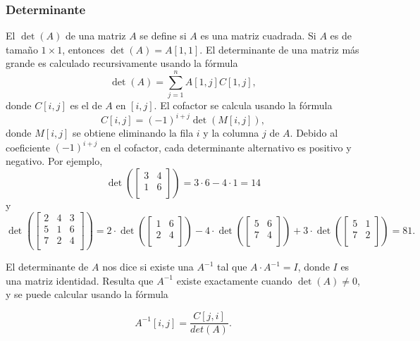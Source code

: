 \subsubsection{Determinante}


El  $\det(A)$ de una matriz $A$
se define si $A$ es una matriz cuadrada.
Si $A$ es de tamaño $1 \times 1$,
entonces $\det(A)=A[1,1]$.
El determinante de una matriz más grande es
calculado recursivamente usando la fórmula 
\[\det(A)=\sum_{j=1}^n A[1,j] C[1,j],\]
donde $C[i,j]$ es el  de $A$
en $[i,j]$.
El cofactor se calcula usando la fórmula
\[C[i,j] = (-1)^{i+j} \det(M[i,j]),\]
donde $M[i,j]$ se obtiene eliminando
la fila $i$ y la columna $j$ de $A$.
Debido al coeficiente $(-1)^{i+j}$ en el cofactor,
cada determinante alternativo es positivo
y negativo.
Por ejemplo,
\[
\det(
 \begin{bmatrix}
  3 & 4 \\
  1 & 6 \\
 \end{bmatrix}
) = 3 \cdot 6 - 4 \cdot 1 = 14 
\]
y
\[
\det(
 \begin{bmatrix}
  2 & 4 & 3 \\
  5 & 1 & 6 \\
  7 & 2 & 4 \\
 \end{bmatrix}
) = 
2 \cdot
\det(
 \begin{bmatrix}
  1 & 6 \\
  2 & 4 \\
 \end{bmatrix}
)
-4 \cdot
\det(
 \begin{bmatrix}
  5 & 6 \\
  7 & 4 \\
 \end{bmatrix}
)
+3 \cdot
\det(
 \begin{bmatrix}
  5 & 1 \\
  7 & 2 \\
 \end{bmatrix}
) = 81.
\]


El determinante de $A$ nos dice
si existe una 
$A^{-1}$ tal que $A \cdot A^{-1} = I$,
donde $I$ es una matriz identidad.
Resulta que $A^{-1}$ existe
exactamente cuando $\det(A) \neq 0$,
y se puede calcular usando la fórmula

\[A^{-1}[i,j] = \frac{C[j,i]}{det(A)}.\]

